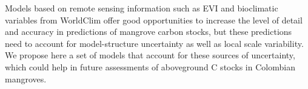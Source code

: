 \documentclass[review, authoryear]{elsarticle}   	%
\begin{document}
%
%

Models based on remote sensing information such as EVI and bioclimatic variables from WorldClim offer good opportunities to increase the level of detail and accuracy in predictions of mangrove carbon stocks, but these predictions need to account for model-structure uncertainty as well as local scale variability. We propose here a set of models that account for these sources of uncertainty, which could help in future assessments of aboveground C stocks in Colombian mangroves.
\end{document}
